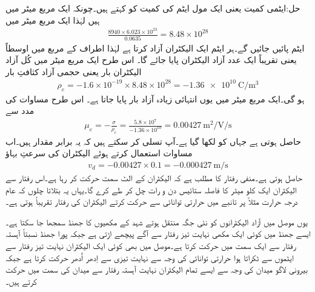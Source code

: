 حل:ایٹمی کمیت  یعنی ایک مول ایٹم کی کمیت کو کہتے ہیں۔چونکہ ایک مربع میٹر میں  ہیں لہٰذا ایک مربع میٹر میں
\begin{align*}
\frac{8940 \times 6.023 \times 10^{23}}{0.0635}=8.48 \times 10^{28}
\end{align*} 
ایٹم پائیں جائیں گے۔ہر ایٹم ایک الیکٹران آزاد کرتا ہے لہٰذا  اطراف کے مربع میں اوسطاً  یعنی تقریباً ایک عدد آزاد الیکٹران پایا جائے گا۔ اس طرح  ایک مربع میٹر میں کُل آزاد الیکٹران بار یعنی حجمی آزاد کثافتِ بار
\begin{align}\label{مساوات_کپیسٹر_موصل_آزاد_بار_کثافت}
\rho_e=-1.6 \times 10^{-19} \times 8.48 \times 10^{28}=\SI{-1.36e10}{\coulomb \per \meter^3}
\end{align}
ہو گی۔ایک مربع میٹر میں یوں انتہائی زیادہ آزاد بار پایا جاتا ہے۔ اس طرح مساوات  کی مدد سے
\begin{align*}
\mu_e=-\frac{\sigma}{\rho_e}=\frac{5.8 \times 10^7}{-1.36 \times 10^{10}}=\SI{0.00427}{\meter \squared \per \volt \per \second}
\end{align*}
حاصل ہوتی ہے جہاں  کو  لکھا گیا ہے۔آپ تسلی کر سکتے ہیں کہ یہ برابر مقدار ہیں۔اب مساوات   استعمال کرتے ہوئے الیکٹران کی  سرعتِ بہاؤ 
\begin{align*}
v_d = -0.00427 \times 0.1=\SI{-0.000427}{\meter \per \second}
\end{align*}
حاصل ہوتی ہے۔منفی رفتار کا مطلب ہے کہ الیکٹران  کے الٹ سمت حرکت کر رہا ہے۔اس رفتار سے الیکٹران ایک کلو میٹر کا فاصلہ ستائیس دن و رات چل کر طے کرے گا۔یہاں یہ بتلاتا چلوں کہ عام درجہ حرارت مثلاً  پر تانبے میں حرارتی توانائی سے حرکت کرتے الیکٹران کی رفتار تقریباً  ہوتی ہے۔

یوں موصل میں آزاد الیکٹرانوں کو نئی جگہ منتقل ہوتے  شہد کے مکھیوں کا جھنڈ  سمجھا جا سکتا ہے۔ایسے جھنڈ میں کوئی ایک مکھی نہایت تیز رفتار سے آگے پیچھے اڑتی ہے جبکہ پورا جھنڈ  نسبتاً آہستہ رفتار سے ایک سمت میں حرکت کرتا ہے۔موصل میں بھی کوئی ایک الیکٹران نہایت تیز رفتار سے ایٹموں سے ٹکراتا ہوا حرارتی توانائی کی وجہ سے  نہایت تیزی سے  اِدھر اُدھر حرکت کرتا ہے جبکہ بیرونی لاگو میدان کی وجہ سے ایسے تمام الیکٹران نہایت آہستہ رفتار سے میدان کی سمت میں حرکت کرتے ہیں۔

